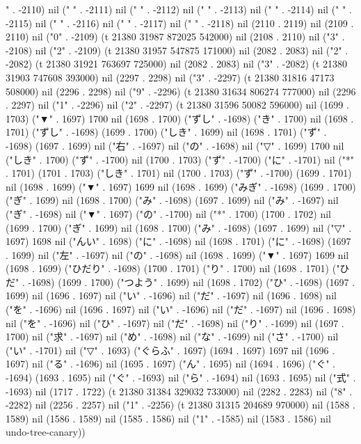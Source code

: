 " . -2110) nil (" " . -2111) nil (" " . -2112) nil (" " . -2113) nil (" " . -2114) nil (" " . -2115) nil (" " . -2116) nil (" " . -2117) nil (" " . -2118) nil (2110 . 2119) nil (2109 . 2110) nil ("0" . -2109) (t 21380 31987 872025 542000) nil (2108 . 2110) nil ("3" . -2108) nil ("2" . -2109) (t 21380 31957 547875 171000) nil (2082 . 2083) nil ("2" . -2082) (t 21380 31921 763697 725000) nil (2082 . 2083) nil ("3" . -2082) (t 21380 31903 747608 393000) nil (2297 . 2298) nil ("3" . -2297) (t 21380 31816 47173 508000) nil (2296 . 2298) nil ("9" . -2296) (t 21380 31634 806274 777000) nil (2296 . 2297) nil ("1" . -2296) nil ("2" . -2297) (t 21380 31596 50082 596000) nil (1699 . 1703) ("▼" . 1697) 1700 nil (1698 . 1700) ("ずし" . -1698) ("き" . 1700) nil (1698 . 1701) ("ずし" . -1698) (1699 . 1700) ("しき" . 1699) nil (1698 . 1701) ("ず" . -1698) (1697 . 1699) nil ("右" . -1697) nil ("の" . -1698) nil ("▽" . 1699) 1700 nil ("しき" . 1700) ("ず" . -1700) nil (1700 . 1703) ("ず" . -1700) ("に" . -1701) nil ("*" . 1701) (1701 . 1703) ("しき" . 1701) nil (1700 . 1703) ("ず" . -1700) (1699 . 1701) nil (1698 . 1699) ("▼" . 1697) 1699 nil (1698 . 1699) ("みぎ" . -1698) (1699 . 1700) ("ぎ" . 1699) nil (1698 . 1700) ("み" . -1698) (1697 . 1699) nil ("み" . -1697) nil ("ぎ" . -1698) nil ("▼" . 1697) ("の" . -1700) nil ("*" . 1700) (1700 . 1702) nil (1699 . 1700) ("ぎ" . 1699) nil (1698 . 1700) ("み" . -1698) (1697 . 1699) nil ("▽" . 1697) 1698 nil ("んい" . 1698) ("に" . -1698) nil (1698 . 1701) ("に" . -1698) (1697 . 1699) nil ("左" . -1697) nil ("の" . -1698) nil (1698 . 1699) ("▼" . 1697) 1699 nil (1698 . 1699) ("ひだり" . -1698) (1700 . 1701) ("り" . 1700) nil (1698 . 1701) ("ひだ" . -1698) (1699 . 1700) ("つよう" . 1699) nil (1698 . 1702) ("ひ" . -1698) (1697 . 1699) nil (1696 . 1697) nil ("い" . -1696) nil ("だ" . -1697) nil (1696 . 1698) nil ("を" . -1696) nil (1696 . 1697) nil ("い" . -1696) nil ("だ" . -1697) nil (1696 . 1698) nil ("を" . -1696) nil ("ひ" . -1697) nil ("だ" . -1698) nil ("り" . -1699) nil (1697 . 1700) nil ("求" . -1697) nil ("め" . -1698) nil ("な" . -1699) nil ("さ" . -1700) nil ("い" . -1701) nil ("▽" . 1693) ("ぐらふ" . 1697) (1694 . 1697) 1697 nil (1696 . 1697) nil ("る" . -1696) nil (1695 . 1697) ("ん" . 1695) nil (1694 . 1696) ("ぐ" . -1694) (1693 . 1695) nil ("ぐ" . -1693) nil ("ら" . -1694) nil (1693 . 1695) nil ("式" . -1693) nil (1717 . 1722) (t 21380 31384 329032 733000) nil (2282 . 2283) nil ("8" . -2282) nil (2256 . 2257) nil ("1" . -2256) (t 21380 31315 204689 970000) nil (1588 . 1589) nil (1586 . 1589) nil (1585 . 1586) nil ("1" . -1585) nil (1583 . 1586) nil undo-tree-canary))
